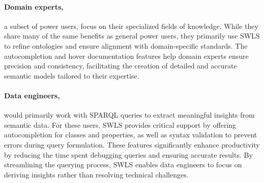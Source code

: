 \paragraph{Domain experts,} a subset of power users, focus on their specialized fields of knowledge. 
While they share many of the same benefits as general power users, they primarily use SWLS to refine ontologies and ensure alignment with domain-specific standards. 
The autocompletion and hover documentation features help domain experts ensure precision and consistency, facilitating the creation of detailed and accurate semantic models tailored to their expertise.

\paragraph{Data engineers,} would primarily work with SPARQL queries to extract meaningful insights from semantic data. 
For these users, SWLS provides critical support by offering autocompletion for classes and properties, as well as syntax validation to prevent errors during query formulation. 
These features significantly enhance productivity by reducing the time spent debugging queries and ensuring accurate results. 
By streamlining the querying process, SWLS enables data engineers to focus on deriving insights rather than resolving technical challenges.


